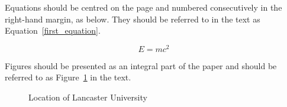 \documentclass[11pt]{article}
\begin{document}
% 

Equations should be centred on the page and numbered consecutively in the right-hand margin, as below. They should be referred to in the text as Equation~\ref{first_equation}. 

\begin{equation}
E=mc^2
\label{first_equation}
\end{equation}

Figures should be presented as an integral part of the paper and should be referred to as Figure~\ref{first_figure} in the text.

\begin{figure}[htbp] \begin{center} 
 \caption{Location of Lancaster University} \label{first_figure} \end{center} \end{figure} %
\end{document}
